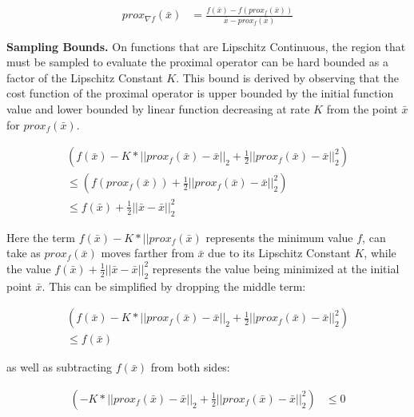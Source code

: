 \vspace{-10pt}\begin{align}
  prox_{\nabla f}\left(\bar{x}\right) &= \frac{f\left(\bar{x}\right) - f\left(prox_f\left(\bar{x}\right)\right)}{\bar{x} - prox_f\left(\bar{x}\right)}
\end{align}

\noindent \textbf{Sampling Bounds.} On functions that are Lipschitz Continuous, the region that must be sampled to evaluate the proximal operator can be hard bounded as a factor of the Lipschitz Constant $K$. This bound is derived by observing that the cost function of the proximal operator is upper bounded by the initial function value and lower bounded by linear function decreasing at rate $K$ from the point $\bar{x}$ for $prox_f(\bar{x})$.

\vspace{-10pt}\begin{align*}
  \left(f\left(\bar{x}\right) - K*||prox_f\left(\bar{x}\right) - \bar{x}||_2  + \tfrac{1}{2}|| prox_f\left(\bar{x}\right)-\bar{x}||_2^2\right)\\
    \leq \left(f\left(prox_f\left(\bar{x}\right)\right) + \tfrac{1}{2}|| prox_f\left(\bar{x}\right)-\bar{x}||_2^2\right)\\
    \leq f\left(\bar{x}\right) + \tfrac{1}{2}||\bar{x} - \bar{x}||_2^2
\end{align*}

Here the term $f\left(\bar{x}\right) - K*||prox_f\left(\bar{x}\right)$ represents the minimum value $f$, can take as $prox_f\left(\bar{x}\right)$ moves farther from $\bar{x}$ due to its Lipschitz Constant $K$, while the value $f\left(\bar{x}\right) + \tfrac{1}{2}||\bar{x} - \bar{x}||_2^2$ represents the value being minimized at the initial point $\bar{x}$. This can be simplified by dropping the middle term: 

\vspace{-10pt}\begin{align*}
  \left(f(\bar{x}) - K*||prox_f\left(\bar{x}\right) - \bar{x}||_2  + \tfrac{1}{2}|| prox_f\left(\bar{x}\right)-\bar{x}||_2^2\right)\\
    \leq f\left(\bar{x}\right)
\end{align*}


as well as subtracting $f\left(\bar{x}\right)$ from both sides:

\vspace{-10pt}\begin{align*}
  \left( - K*||prox_f\left(\bar{x}\right) - \bar{x}||_2  + \tfrac{1}{2}|| prox_f\left(\bar{x}\right)-\bar{x}||_2^2\right) &\leq 0
\end{align*}

